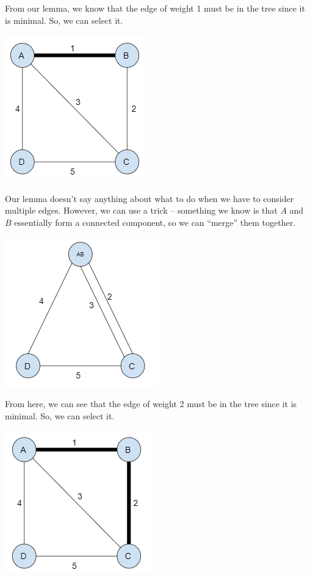 \documentclass[letterpaper]{article}
\begin{document}
\begin{mdframed}[]
    From our lemma, we know that the edge of weight 1 must be in the tree since it is minimal. So, we can select it. 
    \begin{center}
        \includegraphics[scale=0.8]{assets/mst_2.png}
    \end{center}
    Our lemma doesn't say anything about what to do when we have to consider multiple edges. However, we can use a trick -- something we know is that $A$ and $B$ essentially form a connected component, so we can ``merge'' them together.
    \begin{center}
        \includegraphics[scale=0.8]{assets/mst_2a.png}
    \end{center}
    From here, we can see that the edge of weight 2 must be in the tree since it is minimal. So, we can select it. 
    \begin{center}
        \includegraphics[scale=0.8]{assets/mst_3.png}

\end{center}
\end{mdframed}
\end{document}
